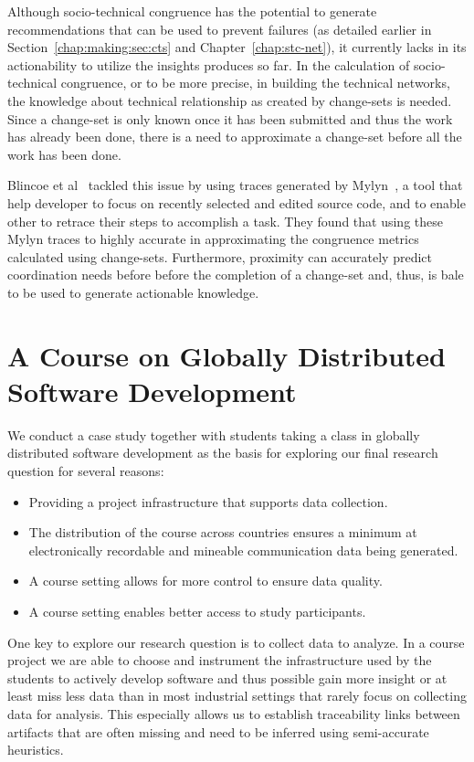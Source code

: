 Although socio-technical congruence has the potential to generate recommendations that can be used to prevent failures (as detailed earlier in Section~\ref{chap:making:sec:cts} and Chapter~\ref{chap:stc-net}), it currently lacks in its actionability to utilize the insights produces so far.
In the calculation of socio-technical congruence, or to be more precise, in building the technical networks, the knowledge about technical relationship as created by change-sets is needed.
Since a change-set is only known once it has been submitted and thus the work has already been done, there is a need to approximate a change-set before all the work has been done.

Blincoe et al~\cite{blincoe:cscw:2012} tackled this issue by using traces generated by Mylyn~\cite{kersten:aosd:2005}, a tool that help developer to focus on recently selected and edited source code, and to enable other to retrace their steps to accomplish a task.
They found that using these Mylyn traces to highly accurate in approximating the congruence metrics calculated using change-sets.
Furthermore, proximity can accurately predict coordination needs before before the completion of a change-set and, thus, is bale to be used to generate actionable knowledge.

\section{A Course on Globally Distributed Software Development}
We conduct a case study together with students taking a class in globally distributed software development as the basis for exploring our final research question for several reasons:
\begin{itemize}
\item Providing a project infrastructure that supports data collection.
\item The distribution of the course across countries ensures a minimum at electronically recordable and mineable communication data being generated.
\item A course setting allows for more control to ensure data quality.
\item A course setting enables better access to study participants.
\end{itemize}

One key to explore our research question is to collect data to analyze.
In a course project we are able to choose and instrument the infrastructure used by the students to actively develop software and thus possible gain more insight or at least miss less data than in most industrial settings that rarely focus on collecting data for analysis.
This especially allows us to establish traceability links between artifacts that are often missing and need to be inferred using semi-accurate heuristics.

